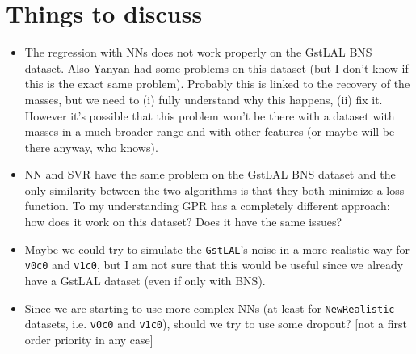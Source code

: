 \documentclass[prd,aps,twocolumn,a4paper,showkeys,nofootinbib]{revtex4-1}
\begin{document}
\section{Things to discuss}
\begin{itemize}
\item The regression with NNs does not work properly on the GstLAL BNS dataset.
Also Yanyan had some problems on this dataset (but I don't know if this is the exact same
problem). Probably this is linked to the recovery of the masses, 
but we need to (i) fully understand why this happens, (ii) fix it. 
However it's possible that this problem won't be there
with a dataset with masses in a much broader range 
and with other features (or maybe will be there anyway, who knows). 

\item NN and SVR have the same problem on the GstLAL BNS dataset and the only 
similarity between the two algorithms is that they both minimize a loss function. 
To my understanding GPR has a completely different approach: how does it work on this dataset? 
Does it have the same issues? 

\item Maybe we could try to simulate the \texttt{GstLAL}'s noise in a more realistic way
for \texttt{v0c0} and \texttt{v1c0}, but I am not sure that this would be useful since 
we already have a GstLAL dataset (even if only with BNS).

\item Since we are starting to use more complex NNs (at least for \texttt{NewRealistic} 
datasets, i.e. \texttt{v0c0} and \texttt{v1c0}), should we try to use some dropout?
[not a first order priority in any case]
\end{itemize}

\end{document}
